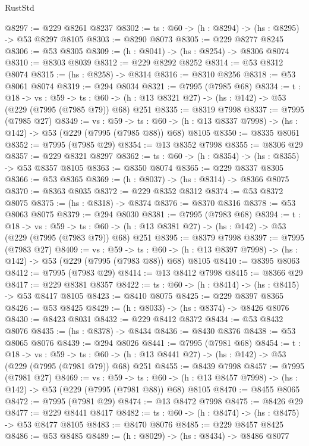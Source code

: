 \begin{lexlean}{RustStd}
\begin{coremodule}
@8297 := @229 @8261 @8237
@8302 := {ts : @60} -> (h : @8294) -> (hs : @8295) -> @53 @8297 @8105
@8303 := @8290 @8073
@8305 := @229 @8277 @8245
@8306 := @53 @8305
@8309 := (h : @8041) -> (hs : @8254) -> @8306 @8074
@8310 := @8303 @8039
@8312 := @229 @8292 @8252
@8314 := @53 @8312 @8074
@8315 := (hs : @8258) -> @8314
@8316 := @8310 @8256
@8318 := @53 @8061 @8074
@8319 := @294 @8034
@8321 := @7995 (@7985 @68)
@8334 := {t : @18} ->
  {vs : @59} ->
  {ts : @60} -> (h : @13 @8321 @27) -> (hs : @142) -> @53 (@229 (@7995 (@7985 @79)) @68) @251
@8335 := @8319 @7998
@8337 := @7995 (@7985 @27)
@8349 := {vs : @59} ->
  {ts : @60} -> (h : @13 @8337 @7998) -> (hs : @142) -> @53 (@229 (@7995 (@7985 @88)) @68) @8105
@8350 := @8335 @8061
@8352 := @7995 (@7985 @29)
@8354 := @13 @8352 @7998
@8355 := @8306 @29
@8357 := @229 @8321 @8297
@8362 := {ts : @60} -> (h : @8354) -> (hs : @8355) -> @53 @8357 @8105
@8363 := @8350 @8074
@8365 := @229 @8337 @8305
@8366 := @53 @8365
@8369 := (h : @8037) -> (hs : @8314) -> @8366 @8075
@8370 := @8363 @8035
@8372 := @229 @8352 @8312
@8374 := @53 @8372 @8075
@8375 := (hs : @8318) -> @8374
@8376 := @8370 @8316
@8378 := @53 @8063 @8075
@8379 := @294 @8030
@8381 := @7995 (@7983 @68)
@8394 := {t : @18} ->
  {vs : @59} ->
  {ts : @60} -> (h : @13 @8381 @27) -> (hs : @142) -> @53 (@229 (@7995 (@7983 @79)) @68) @251
@8395 := @8379 @7998
@8397 := @7995 (@7983 @27)
@8409 := {vs : @59} ->
  {ts : @60} -> (h : @13 @8397 @7998) -> (hs : @142) -> @53 (@229 (@7995 (@7983 @88)) @68) @8105
@8410 := @8395 @8063
@8412 := @7995 (@7983 @29)
@8414 := @13 @8412 @7998
@8415 := @8366 @29
@8417 := @229 @8381 @8357
@8422 := {ts : @60} -> (h : @8414) -> (hs : @8415) -> @53 @8417 @8105
@8423 := @8410 @8075
@8425 := @229 @8397 @8365
@8426 := @53 @8425
@8429 := (h : @8033) -> (hs : @8374) -> @8426 @8076
@8430 := @8423 @8031
@8432 := @229 @8412 @8372
@8434 := @53 @8432 @8076
@8435 := (hs : @8378) -> @8434
@8436 := @8430 @8376
@8438 := @53 @8065 @8076
@8439 := @294 @8026
@8441 := @7995 (@7981 @68)
@8454 := {t : @18} ->
  {vs : @59} ->
  {ts : @60} -> (h : @13 @8441 @27) -> (hs : @142) -> @53 (@229 (@7995 (@7981 @79)) @68) @251
@8455 := @8439 @7998
@8457 := @7995 (@7981 @27)
@8469 := {vs : @59} ->
  {ts : @60} -> (h : @13 @8457 @7998) -> (hs : @142) -> @53 (@229 (@7995 (@7981 @88)) @68) @8105
@8470 := @8455 @8065
@8472 := @7995 (@7981 @29)
@8474 := @13 @8472 @7998
@8475 := @8426 @29
@8477 := @229 @8441 @8417
@8482 := {ts : @60} -> (h : @8474) -> (hs : @8475) -> @53 @8477 @8105
@8483 := @8470 @8076
@8485 := @229 @8457 @8425
@8486 := @53 @8485
@8489 := (h : @8029) -> (hs : @8434) -> @8486 @8077

\end{coremodule}
\end{lexlean}
